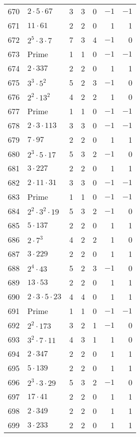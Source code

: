 \documentclass[12pt]{article}
\begin{document}
\begin{tabular}{|r|l|r|r|r|r|r|}
670 & $2 \cdot 5 \cdot 67$ & 3 & 3 & 0 & $-1$ & $-1$ \\
671 & $11 \cdot 61$ & 2 & 2 & 0 & 1 & 1 \\
672 & $2^5 \cdot 3 \cdot 7$ & 7 & 3 & 4 & $-1$ & 0 \\
673 & Prime & 1 & 1 & 0 & $-1$ & $-1$ \\
674 & $2 \cdot 337$ & 2 & 2 & 0 & 1 & 1 \\
675 & $3^3 \cdot 5^2$ & 5 & 2 & 3 & $-1$ & 0 \\
676 & $2^2 \cdot 13^2$ & 4 & 2 & 2 & 1 & 0 \\
677 & Prime & 1 & 1 & 0 & $-1$ & $-1$ \\
678 & $2 \cdot 3 \cdot 113$ & 3 & 3 & 0 & $-1$ & $-1$ \\
679 & $7 \cdot 97$ & 2 & 2 & 0 & 1 & 1 \\
680 & $2^3 \cdot 5 \cdot 17$ & 5 & 3 & 2 & $-1$ & 0 \\
681 & $3 \cdot 227$ & 2 & 2 & 0 & 1 & 1 \\
682 & $2 \cdot 11 \cdot 31$ & 3 & 3 & 0 & $-1$ & $-1$ \\
683 & Prime & 1 & 1 & 0 & $-1$ & $-1$ \\
684 & $2^2 \cdot 3^2 \cdot 19$ & 5 & 3 & 2 & $-1$ & 0 \\
685 & $5 \cdot 137$ & 2 & 2 & 0 & 1 & 1 \\
686 & $2 \cdot 7^3$ & 4 & 2 & 2 & 1 & 0 \\
687 & $3 \cdot 229$ & 2 & 2 & 0 & 1 & 1 \\
688 & $2^4 \cdot 43$ & 5 & 2 & 3 & $-1$ & 0 \\
689 & $13 \cdot 53$ & 2 & 2 & 0 & 1 & 1 \\
690 & $2 \cdot 3 \cdot 5 \cdot 23$ & 4 & 4 & 0 & 1 & 1 \\
691 & Prime & 1 & 1 & 0 & $-1$ & $-1$ \\
692 & $2^2 \cdot 173$ & 3 & 2 & 1 & $-1$ & 0 \\
693 & $3^2 \cdot 7 \cdot 11$ & 4 & 3 & 1 & 1 & 0 \\
694 & $2 \cdot 347$ & 2 & 2 & 0 & 1 & 1 \\
695 & $5 \cdot 139$ & 2 & 2 & 0 & 1 & 1 \\
696 & $2^3 \cdot 3 \cdot 29$ & 5 & 3 & 2 & $-1$ & 0 \\
697 & $17 \cdot 41$ & 2 & 2 & 0 & 1 & 1 \\
698 & $2 \cdot 349$ & 2 & 2 & 0 & 1 & 1 \\
699 & $3 \cdot 233$ & 2 & 2 & 0 & 1 & 1 \\

\end{tabular}
\end{document}
